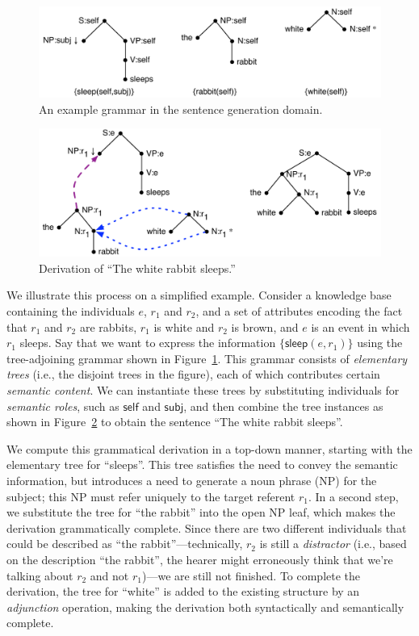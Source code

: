 \documentclass[letterpaper]{article}
\begin{document}
\begin{figure}[t]
  \centering
  \includegraphics[width=0.75\columnwidth]{pic-grammar}
  \caption{An example grammar in the sentence generation domain.}
  \label{fig:white-rabbit-sleeps-grammar}
\end{figure}

\begin{figure}[t]
  \centering
  \includegraphics[width=0.75\columnwidth]{pic-derivation}
  \caption{Derivation of ``The white rabbit sleeps.''}
  \label{fig:white-rabbit-sleeps-deriv}
\end{figure}


We illustrate this process on a simplified example.  Consider a
knowledge base containing the individuals $e$, $r_1$ and $r_2$, and a
set of attributes encoding the fact that $r_1$ and $r_2$ are rabbits,
$r_1$ is white and $r_2$ is brown, and $e$ is an event in which $r_1$
sleeps.  Say that we want to express the information
$\{\mathsf{sleep}(e,r_1)\}$ using the tree-adjoining grammar shown in
Figure~\ref{fig:white-rabbit-sleeps-grammar}. This grammar consists of
\emph{elementary trees} (i.e., the disjoint trees in the figure), each
of which contributes certain \emph{semantic content}. We can
instantiate these trees by substituting individuals for \emph{semantic
  roles}, such as $\mathsf{self}$ and $\mathsf{subj}$, and then
combine the tree instances as shown in
Figure~\ref{fig:white-rabbit-sleeps-deriv} to obtain the sentence
``The white rabbit sleeps''.

We compute this grammatical derivation in a top-down manner, starting with
the elementary tree for ``sleeps''. This tree satisfies the need to convey
the semantic information, but introduces a need to generate a noun phrase
(NP) for the subject; this NP must refer uniquely to the target referent
$r_1$. In a second step, we substitute the tree for ``the rabbit'' into the
open NP leaf, which makes the derivation grammatically complete. Since
there are two different individuals that could be described as ``the
rabbit''---technically, $r_2$ is still a \emph{distractor} (i.e., based on
the description ``the rabbit'', the hearer might erroneously think that
we're talking about $r_2$ and not $r_1$)---we are still not finished. To
complete the derivation, the tree for ``white'' is added to the existing
structure by an \emph{adjunction} operation, making the derivation
both syntactically and semantically complete.
\end{document}
